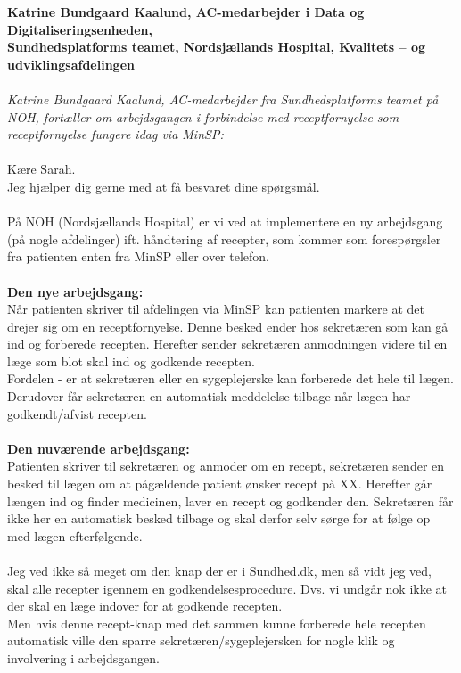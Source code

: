 \textbf{Katrine Bundgaard Kaalund, AC-medarbejder i Data og Digitaliseringsenheden,\\
	Sundhedsplatforms teamet, 
	Nordsjællands Hospital, Kvalitets – og udviklingsafdelingen}\\\\
\textit{Katrine Bundgaard Kaalund, AC-medarbejder fra Sundhedsplatforms teamet på NOH, fortæller om arbejdsgangen i forbindelse med receptfornyelse som receptfornyelse fungere idag via MinSP:}\\\\
Kære Sarah.\\
Jeg hjælper dig gerne med at få besvaret dine spørgsmål.\\\\
På NOH (Nordsjællands Hospital) er vi ved at implementere en ny arbejdsgang (på nogle afdelinger) ift. håndtering af recepter, som kommer som forespørgsler fra patienten enten fra MinSP eller over telefon.\\\\
\textbf{Den nye arbejdsgang:} \\
Når patienten skriver til afdelingen via MinSP kan patienten markere at det drejer sig om en receptfornyelse. Denne besked ender hos sekretæren som kan gå ind og forberede recepten. Herefter sender sekretæren anmodningen videre til en læge som blot skal ind og godkende recepten. \\
Fordelen - er at sekretæren eller en sygeplejerske kan forberede det hele til lægen. Derudover får sekretæren en automatisk meddelelse tilbage når lægen har godkendt/afvist recepten.\\\\
\textbf{Den nuværende arbejdsgang:}\\
Patienten skriver til sekretæren og anmoder om en recept, sekretæren sender en besked til lægen om at pågældende patient ønsker recept på XX. Herefter går længen ind og finder medicinen, laver en recept og godkender den. Sekretæren får ikke her en automatisk besked tilbage og skal derfor selv sørge for at følge op med lægen efterfølgende.\\\\
Jeg ved ikke så meget om den knap der er i Sundhed.dk, men så vidt jeg ved, skal alle recepter igennem en godkendelsesprocedure. Dvs. vi undgår nok ikke at der skal en læge indover for at godkende recepten. \\
Men hvis denne recept-knap med det sammen kunne forberede hele recepten automatisk ville den sparre sekretæren/sygeplejersken for nogle klik og involvering i arbejdsgangen. \\

